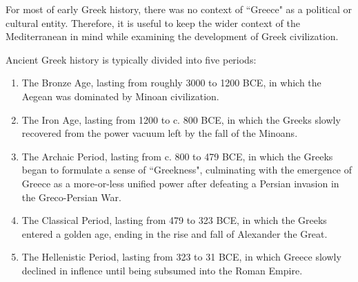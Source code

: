 For most of early Greek history, there was no context of ``Greece" as a political or cultural entity. Therefore, it is useful to keep the wider context of the Mediterranean in mind while examining the development of Greek civilization.

Ancient Greek history is typically divided into five periods:
\begin{enumerate}
\item The Bronze Age, lasting from roughly 3000 to 1200 BCE, in which the Aegean was dominated by Minoan civilization.

\item The Iron Age, lasting from 1200 to c. 800 BCE, in which the Greeks slowly recovered from the power vacuum left by the fall of the Minoans.

\item The Archaic Period, lasting from c. 800 to 479 BCE, in which the Greeks began to formulate a sense of ``Greekness", culminating with the emergence of Greece as a more-or-less unified power after defeating a Persian invasion in the Greco-Persian War.

\item The Classical Period, lasting from 479 to 323 BCE, in which the Greeks entered a golden age, ending in the rise and fall of Alexander the Great.

\item The Hellenistic Period, lasting from 323 to 31 BCE, in which Greece slowly declined in inflence until being subsumed into the Roman Empire.
\end{enumerate}
